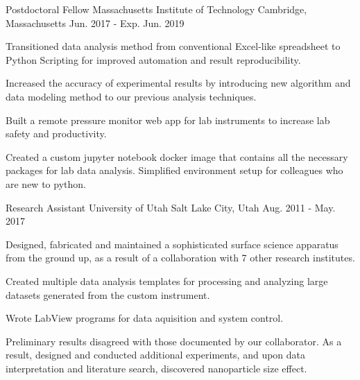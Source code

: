 


\begin{cventries}


\cventry
{Postdoctoral Fellow}
{Massachusetts Institute of Technology}
{Cambridge, Massachusetts}
{Jun. 2017 - Exp. Jun. 2019}
{
\begin{cvitems}
\item {Transitioned data analysis method from conventional Excel-like
    spreadsheet to Python Scripting for improved automation and result
    reproducibility.}
\item {Increased the accuracy of experimental results by introducing new
    algorithm and data modeling method to our previous analysis techniques.}
\item {Built a remote pressure monitor web app for lab instruments to increase
    lab safety and productivity.}
\item {Created a custom jupyter notebook docker image that contains all the
    necessary packages for lab data analysis. Simplified environment setup for
    colleagues who are new to python.}
\end{cvitems}
}


\cventry
{Research Assistant}
{University of Utah}
{Salt Lake City, Utah}
{Aug. 2011 - May. 2017}
{
\begin{cvitems}
\item {Designed, fabricated and maintained a sophisticated surface science
    apparatus from the ground up, as a result of a collaboration with 7 other
    research institutes.}
\item {Created multiple data analysis templates for processing and analyzing
    large datasets generated from the custom instrument.}
\item {Wrote LabView programs for data aquisition and system control.}
\item {Preliminary results disagreed with those documented by our collaborator.
    As a result, designed and conducted additional experiments, and upon data
    interpretation and literature search, discovered nanoparticle size effect.}
\end{cvitems}
}


\end{cventries}